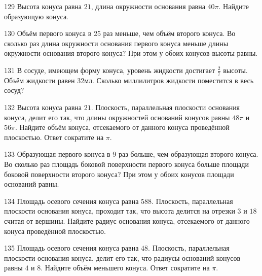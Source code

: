 \documentclass[a4paper]{article}
\begin{document}
\begin{taskBN}{129}
Высота конуса равна $21$, длина окружности основания равна $40\pi$. Найдите образующую конуса. 
\end{taskBN}

\begin{taskBN}{130}
Объём первого конуса в 25 раз меньше, чем объём второго конуса. Во сколько раз длина окружности основания первого конуса меньше длины окружности основания второго конуса? При этом у обоих конусов высоты равны.
\end{taskBN}

\begin{taskBN}{131}
В сосуде, имеющем форму конуса, уровень жидкости достигает $\frac{2}{7}$ высоты. Объём жидкости равен 32мл. Сколько миллилитров жидкости поместится в весь сосуд?
\end{taskBN}

\begin{taskBN}{132}
Высота конуса равна $21$. Плоскость, параллельная плоскости основания конуса,  делит его так, что длины окружностей оснований конусов равны $48\pi$ и $56\pi$. Найдите объём конуса, отсекаемого от данного конуса проведённой плоскостью. Ответ сократите на $\pi$.
\end{taskBN}

\begin{taskBN}{133}
Образующая первого конуса в 9 раз больше, чем образующая второго конуса. Во сколько раз площадь боковой поверхности первого конуса больше площади боковой поверхности второго конуса? При этом у обоих конусов площади оснований равны.
\end{taskBN}

\begin{taskBN}{134}
Площадь осевого сечения конуса равна $588$. Плоскость, параллельная плоскости основания конуса,  проходит так, что высота делится на отрезки $3$ и $18$ считая от вершины. Найдите радиус основания конуса, отсекаемого от данного конуса проведённой плоскостью. 
\end{taskBN}

\begin{taskBN}{135}
Площадь осевого сечения конуса равна $48$. Плоскость, параллельная плоскости основания конуса,  делит его так, что радиусы оснований конусов равны $4$ и $8$. Найдите объём меньшего конуса. Ответ сократите на $\pi$.
\end{taskBN}
\end{document}
